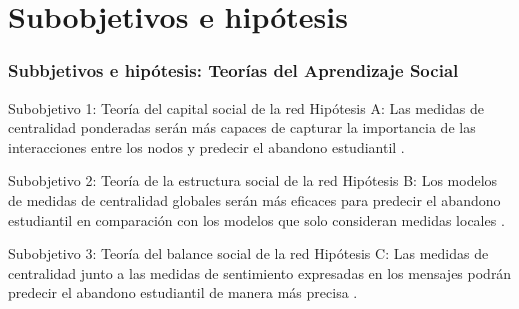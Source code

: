 \documentclass{beamer}
\begin{document}
\section{Subobjetivos e hipótesis}
\begin{frame}
	\frametitle{Subbjetivos e hipótesis: Teorías del Aprendizaje Social}
	\begin{block}{Subobjetivo 1: Teoría del capital social de la red}
		Hipótesis A: Las medidas de centralidad ponderadas serán más capaces de capturar la importancia de las interacciones entre los nodos y predecir el abandono estudiantil \citep{wasko_why_2005, barrat2004a}.
		
	\end{block}
	\begin{block}{Subobjetivo 2: Teoría de la estructura social de la red}
		Hipótesis B: Los modelos de medidas de centralidad globales serán más eficaces para predecir el abandono estudiantil en comparación con los modelos que solo consideran medidas locales \citep{krause_social_2007, abbasi2013a, Mahmoud_2021}.
		
	\end{block}
	\begin{block}{Subobjetivo 3: Teoría del balance social de la red}
		Hipótesis C: Las medidas de centralidad junto a las medidas de sentimiento expresadas en los mensajes podrán predecir el abandono estudiantil de manera más precisa \citep{kim2012a, rawlings_structural_2017, marcos_learning_2019}.
	\end{block}
\end{frame}
\end{document}
